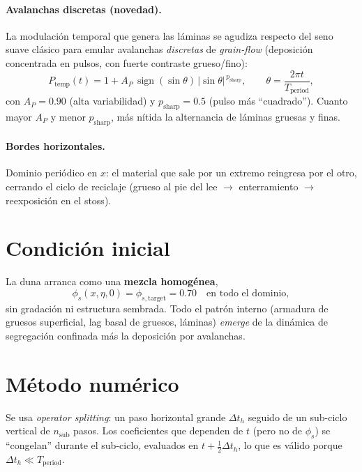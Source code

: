 \documentclass[11pt,a4paper]{article}
\begin{document}
\paragraph{Avalanchas discretas (novedad).}
La modulación temporal que genera las láminas se agudiza respecto del seno
suave clásico para emular avalanchas \emph{discretas} de \emph{grain-flow}
(deposición concentrada en pulsos, con fuerte contraste grueso/fino):
\begin{equation}
    P_{\mathrm{temp}}(t) = 1 + A_P\,\operatorname{sign}(\sin\theta)\,|\sin\theta|^{\,p_{\mathrm{sharp}}},
    \qquad \theta = \frac{2\pi t}{T_{\mathrm{period}}},
    \label{eq:Ptemp}
\end{equation}
con $A_P=0.90$ (alta variabilidad) y $p_{\mathrm{sharp}}=0.5$ (pulso más
``cuadrado''). Cuanto mayor $A_P$ y menor $p_{\mathrm{sharp}}$, más nítida
la alternancia de láminas gruesas y finas.

\paragraph{Bordes horizontales.} Dominio periódico en $x$: el material que
sale por un extremo reingresa por el otro, cerrando el ciclo de reciclaje
(grueso al pie del lee $\to$ enterramiento $\to$ reexposición en el stoss).

\section{Condición inicial}
\label{sec:ci}
La duna arranca como una \textbf{mezcla homogénea},
\begin{equation}
    \phi_s(x,\eta,0) = \phi_{s,\mathrm{target}} = 0.70 \quad \text{en todo el dominio},
\end{equation}
sin gradación ni estructura sembrada. Todo el patrón interno (armadura de
gruesos superficial, lag basal de gruesos, láminas) \emph{emerge} de la
dinámica de segregación confinada más la deposición por avalanchas.

\section{Método numérico}
\label{sec:numerico}
Se usa \emph{operator splitting}: un paso horizontal grande $\Delta t_h$
seguido de un sub-ciclo vertical de $n_{\mathrm{sub}}$ pasos. Los
coeficientes que dependen de $t$ (pero no de $\phi_s$) se ``congelan''
durante el sub-ciclo, evaluados en $t+\tfrac12\Delta t_h$, lo que es válido
porque $\Delta t_h\ll T_{\mathrm{period}}$.
\end{document}
